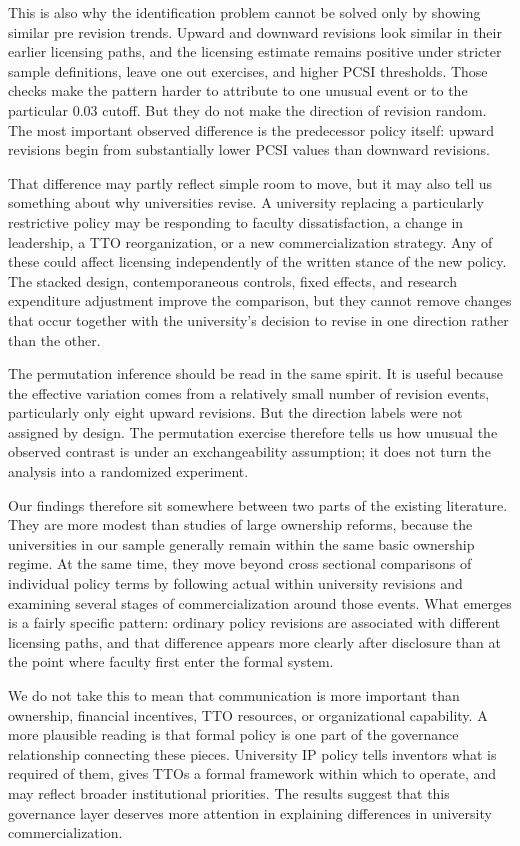 This is also why the identification problem cannot be solved only by showing similar pre revision trends. Upward and downward revisions look similar in their earlier licensing paths, and the licensing estimate remains positive under stricter sample definitions, leave one out exercises, and higher PCSI thresholds. Those checks make the pattern harder to attribute to one unusual event or to the particular 0.03 cutoff. But they do not make the direction of revision random. The most important observed difference is the predecessor policy itself: upward revisions begin from substantially lower PCSI values than downward revisions.

That difference may partly reflect simple room to move, but it may also tell us something about why universities revise. A university replacing a particularly restrictive policy may be responding to faculty dissatisfaction, a change in leadership, a TTO reorganization, or a new commercialization strategy. Any of these could affect licensing independently of the written stance of the new policy. The stacked design, contemporaneous controls, fixed effects, and research expenditure adjustment improve the comparison, but they cannot remove changes that occur together with the university's decision to revise in one direction rather than the other.

The permutation inference should be read in the same spirit. It is useful because the effective variation comes from a relatively small number of revision events, particularly only eight upward revisions. But the direction labels were not assigned by design. The permutation exercise therefore tells us how unusual the observed contrast is under an exchangeability assumption; it does not turn the analysis into a randomized experiment.

Our findings therefore sit somewhere between two parts of the existing literature. They are more modest than studies of large ownership reforms, because the universities in our sample generally remain within the same basic ownership regime. At the same time, they move beyond cross sectional comparisons of individual policy terms by following actual within university revisions and examining several stages of commercialization around those events. What emerges is a fairly specific pattern: ordinary policy revisions are associated with different licensing paths, and that difference appears more clearly after disclosure than at the point where faculty first enter the formal system.

We do not take this to mean that communication is more important than ownership, financial incentives, TTO resources, or organizational capability. A more plausible reading is that formal policy is one part of the governance relationship connecting these pieces. University IP policy tells inventors what is required of them, gives TTOs a formal framework within which to operate, and may reflect broader institutional priorities. The results suggest that this governance layer deserves more attention in explaining differences in university commercialization.

